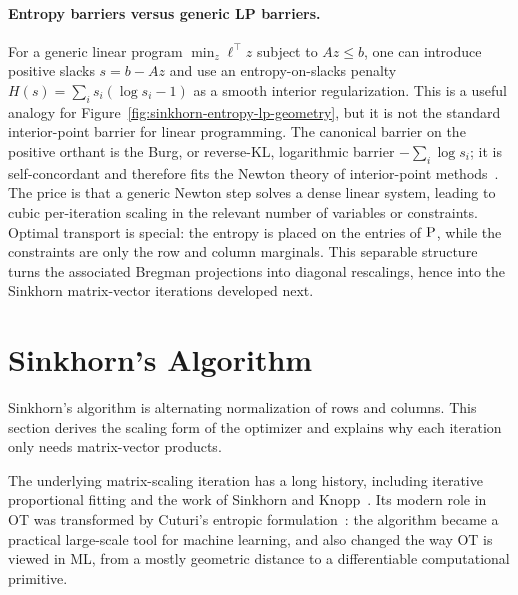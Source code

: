 \paragraph{Entropy barriers versus generic LP barriers.}

For a generic linear program $\min_z \ell^\top z$ subject to $Az\leq b$, one can introduce positive slacks $s=b-Az$ and use an entropy-on-slacks penalty $H(s)=\sum_i s_i(\log s_i-1)$ as a smooth interior regularization. This is a useful analogy for Figure~\ref{fig:sinkhorn-entropy-lp-geometry}, but it is not the standard interior-point barrier for linear programming. The canonical barrier on the positive orthant is the Burg, or reverse-KL, logarithmic barrier $-\sum_i\log s_i$; it is self-concordant and therefore fits the Newton theory of interior-point methods~\cite{nesterov1994interior}. The price is that a generic Newton step solves a dense linear system, leading to cubic per-iteration scaling in the relevant number of variables or constraints. Optimal transport is special: the entropy is placed on the entries of $\P$, while the constraints are only the row and column marginals. This separable structure turns the associated Bregman projections into diagonal rescalings, hence into the Sinkhorn matrix-vector iterations developed next.



\section{Sinkhorn's Algorithm}


Sinkhorn's algorithm is alternating normalization of rows and columns. This section derives the scaling form of the optimizer and explains why each iteration only needs matrix-vector products.

The underlying matrix-scaling iteration has a long history, including iterative proportional fitting and the work of Sinkhorn and Knopp~\cite{Sinkhorn64,SinkhornKnopp67,Sinkhorn67}. Its modern role in OT was transformed by Cuturi's entropic formulation~\cite{CuturiSinkhorn}: the algorithm became a practical large-scale tool for machine learning, and also changed the way OT is viewed in ML, from a mostly geometric distance to a differentiable computational primitive.

